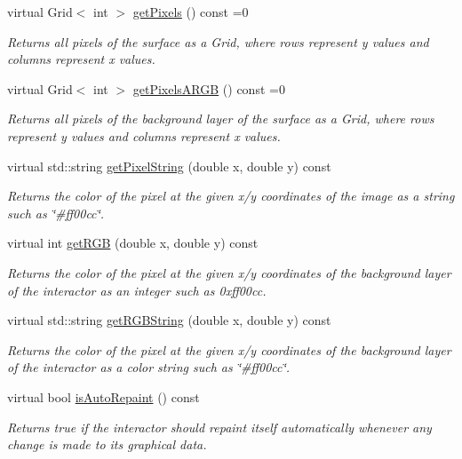 \begin{DoxyCompactItemize}
virtual Grid$<$ int $>$ \mbox{\hyperlink{classGDrawingSurface_a9811240b1241922153dec17d395797cf}{get\+Pixels}} () const =0
\begin{DoxyCompactList}\small\item\em Returns all pixels of the surface as a Grid, where rows represent y values and columns represent x values. \end{DoxyCompactList}\item 
virtual Grid$<$ int $>$ \mbox{\hyperlink{classGDrawingSurface_a5712954f3edce2e1e4dd3109ffe16e05}{get\+Pixels\+A\+R\+GB}} () const =0
\begin{DoxyCompactList}\small\item\em Returns all pixels of the background layer of the surface as a Grid, where rows represent y values and columns represent x values. \end{DoxyCompactList}\item 
virtual std\+::string \mbox{\hyperlink{classGDrawingSurface_a8da04ef488ec5fa498fbbffaf50928fd}{get\+Pixel\+String}} (double x, double y) const
\begin{DoxyCompactList}\small\item\em Returns the color of the pixel at the given x/y coordinates of the image as a string such as \char`\"{}\#ff00cc\char`\"{}. \end{DoxyCompactList}\item 
virtual int \mbox{\hyperlink{classGDrawingSurface_a9e983467cf0c97cfd62433a8471570dc}{get\+R\+GB}} (double x, double y) const
\begin{DoxyCompactList}\small\item\em Returns the color of the pixel at the given x/y coordinates of the background layer of the interactor as an integer such as 0xff00cc. \end{DoxyCompactList}\item 
virtual std\+::string \mbox{\hyperlink{classGDrawingSurface_a456d3582acc3544f37d939f5cb8802fe}{get\+R\+G\+B\+String}} (double x, double y) const
\begin{DoxyCompactList}\small\item\em Returns the color of the pixel at the given x/y coordinates of the background layer of the interactor as a color string such as \char`\"{}\#ff00cc\char`\"{}. \end{DoxyCompactList}\item 
virtual bool \mbox{\hyperlink{classGDrawingSurface_a12c8d52ddfcaa5448ec4bace92ddee6c}{is\+Auto\+Repaint}} () const
\begin{DoxyCompactList}\small\item\em Returns true if the interactor should repaint itself automatically whenever any change is made to its graphical data. \end{DoxyCompactList}\item 

\end{DoxyCompactItemize}

